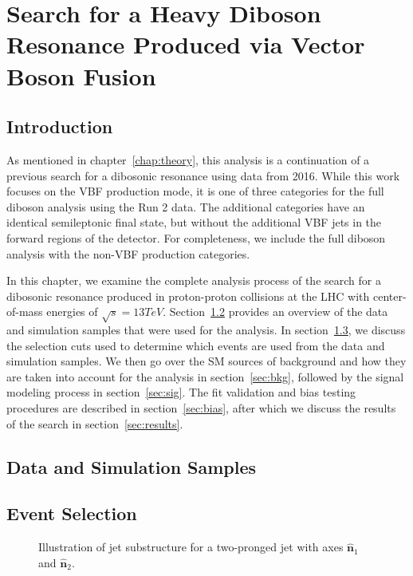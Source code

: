 
\chapter{Search for a Heavy Diboson Resonance Produced via Vector Boson Fusion}
\label{chap:search}

\section{Introduction}

As mentioned in chapter~\ref{chap:theory}, this analysis is a continuation of a previous search for a dibosonic resonance using data from 2016.
While this work focuses on the VBF production mode, it is one of three categories for the full diboson analysis using the Run 2 data.
The additional categories have an identical semileptonic final state, but without the additional VBF jets in the forward regions of the detector.
For completeness, we include the full diboson analysis with the non-VBF production categories.

In this chapter, we examine the complete analysis process of the search for a dibosonic resonance produced in proton-proton collisions at the LHC with center-of-mass energies of $\sqrt{s}=13\unit{TeV}$.
Section~\ref{sec:samples} provides an overview of the data and simulation samples that were used for the analysis.
In section~\ref{sec:events}, we discuss the selection cuts used to determine which events are used from the data and simulation samples.
We then go over the SM sources of background and how they are taken into account for the analysis in section~\ref{sec:bkg}, followed by the signal modeling process in section~\ref{sec:sig}.
The fit validation and bias testing procedures are described in section~\ref{sec:bias}, after which we discuss the results of the search in section~\ref{sec:results}.

\section{Data and Simulation Samples}
\label{sec:samples}

\section{Event Selection}
\label{sec:events}

\begin{figure}[htbp]
  \centering
  
  \caption{Illustration of jet substructure for a two-pronged jet with axes $\mathbf{\hat{n}}_1$ and $\mathbf{\hat{n}}_2$.}
  \label{fig:jet}
\end{figure}

